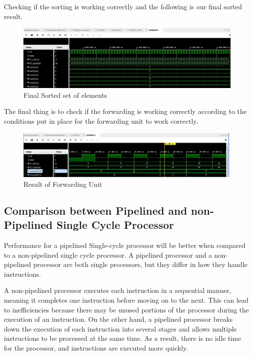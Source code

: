 \documentclass{article}
\begin{document}
Checking if the sorting is working correctly and the following is our final sorted result. 

\begin{figure}[h]
    \centering
    \includegraphics*[width = 13 cm]{final_sorted.jpeg}
    \caption{Final Sorted set of elements}
    \label{fig: label 3}
\end{figure}

\newpage

The final thing is to check if the forwarding is working correctly according to the conditions put in place for the forwarding unit to work correctly.

\begin{figure}[h]
    \centering
    \includegraphics*[width = 13 cm]{forwarding.jpeg}
    \caption{Result of Forwarding Unit}
    \label{fig: label 4}
\end{figure}

\subsection{Comparison between Pipelined and non-Pipelined Single Cycle Processor}

Performance for a pipelined Single-cycle processor will be better when compared to a non-pipelined single cycle processor. A pipelined processor and a non-pipelined processor are both single processors, but they differ in how they handle instructions.

A non-pipelined processor executes each instruction in a sequential manner, meaning it completes one instruction before moving on to the next. This can lead to inefficiencies because there may be unused portions of the processor during the execution of an instruction. On the other hand, a pipelined processor breaks down the execution of each instruction into several stages and allows multiple instructions to be processed at the same time. As a result, there is no idle time for the processor, and instructions are executed more quickly.
\end{document}

